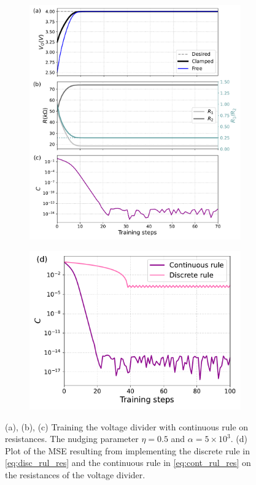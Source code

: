 \documentclass[10.5pt]{article}
\begin{document}
\begin{figure}
\begin{subfigure}{.5\textwidth}
  \centering
  \includegraphics[width=0.9\columnwidth]{../figures_tex/volt_res_mse_simp_cont.pdf}
\end{subfigure}%
\begin{subfigure}{.5\textwidth}
  \centering
  \includegraphics[width=0.8\columnwidth]{../figures_tex/res_disccont_simple.pdf}
\end{subfigure}
\caption{(a), (b), (c) Training the voltage divider with continuous rule on resistances. The nudging parameter $\eta=0.5$ and $\alpha=5\times 10^3$. (d) Plot of the MSE resulting from implementing the discrete rule in \cref{eq:disc_rul_res} and the continuous rule in \cref{eq:cont_rul_res} on the resistances of the voltage divider.}
\label{fig:fig}
\end{figure}
\end{document}
